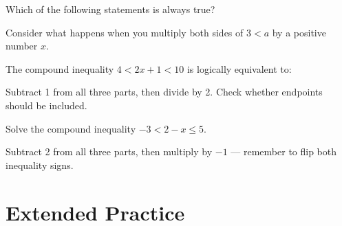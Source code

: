 \documentclass{ximera}
\begin{document}
\begin{problem}
Which of the following statements is always true?
\begin{hint}
Consider what happens when you multiply both sides of $3 < a$ by a positive number $x$.
\end{hint}
\begin{multipleChoice}
\end{multipleChoice}
\end{problem}

\begin{problem}
The compound inequality $4 < 2x + 1 < 10$ is logically equivalent to:
\begin{hint}
Subtract 1 from all three parts, then divide by 2. Check whether endpoints should be included.
\end{hint}
\begin{multipleChoice}
\end{multipleChoice}
\end{problem}

\begin{problem}
Solve the compound inequality $-3 < 2 - x \leq 5$.
\begin{hint}
Subtract 2 from all three parts, then multiply by $-1$ — remember to flip both inequality signs.
\end{hint}
\begin{multipleChoice}
  \choice[correct]{$[-3,5)$}
  \choice{$(-3,5]$}
  \choice{$[-5,3)$}
  \choice{$(-5,3]$}
\end{multipleChoice}
\end{problem}


\bigskip
\section*{Extended Practice}
\end{document}
